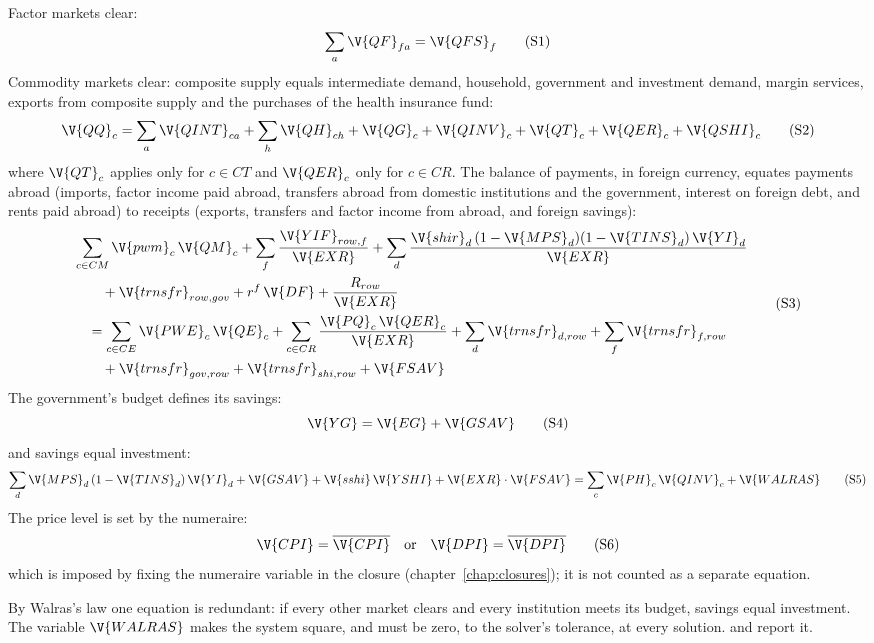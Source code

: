 Factor markets clear:
\begin{equation}
\sum_a \V{QF}_{fa} = \V{QFS}_f
\tag{S1}\label{eq:S1}
\end{equation}
Commodity markets clear: composite supply equals intermediate demand,
household, government and investment demand, margin services, exports from
composite supply and the purchases of the health insurance fund:
\begin{equation}
\V{QQ}_c = \sum_a \V{QINT}_{ca} + \sum_h \V{QH}_{ch} + \V{QG}_c + \V{QINV}_c + \V{QT}_c + \V{QER}_c + \V{QSHI}_c
\tag{S2}\label{eq:S2}
\end{equation}
where $\V{QT}_c$ applies only for $c \in CT$ and $\V{QER}_c$ only for
$c \in CR$. The balance of payments, in foreign currency, equates payments
abroad (imports, factor income paid abroad, transfers abroad from domestic
institutions and the government, interest on foreign debt, and rents paid
abroad) to receipts (exports, transfers and factor income from abroad, and
foreign savings):
\begin{equation}
\begin{split}
&\sum_{c \in CM} \V{pwm}_c\,\V{QM}_c + \sum_f \frac{\V{YIF}_{row,f}}{\V{EXR}}
  + \sum_d \frac{\V{shir}_d\,(1 - \V{MPS}_d)(1 - \V{TINS}_d)\,\V{YI}_d}{\V{EXR}}\\
&\qquad + \V{trnsfr}_{row,gov} + r^f\,\V{DF} + \frac{R_{row}}{\V{EXR}}\\
&\quad = \sum_{c \in CE} \V{PWE}_c\,\V{QE}_c + \sum_{c \in CR} \frac{\V{PQ}_c\,\V{QER}_c}{\V{EXR}}
  + \sum_d \V{trnsfr}_{d,row} + \sum_f \V{trnsfr}_{f,row}\\
&\qquad + \V{trnsfr}_{gov,row} + \V{trnsfr}_{shi,row} + \V{FSAV}
\end{split}
\tag{S3}\label{eq:S3}
\end{equation}
The government's budget defines its savings:
\begin{equation}
\V{YG} = \V{EG} + \V{GSAV}
\tag{S4}\label{eq:S4}
\end{equation}
and savings equal investment:
\begin{equation}
\sum_d \V{MPS}_d\,(1 - \V{TINS}_d)\,\V{YI}_d + \V{GSAV} + \V{sshi}\,\V{YSHI} + \V{EXR}\cdot\V{FSAV}
  = \sum_c \V{PH}_c\,\V{QINV}_c + \V{WALRAS}
\tag{S5}\label{eq:S5}
\end{equation}
The price level is set by the numeraire:
\begin{equation}
\V{CPI} = \overline{\V{CPI}} \quad\text{or}\quad \V{DPI} = \overline{\V{DPI}}
\tag{S6}\label{eq:S6}
\end{equation}
which is imposed by fixing the numeraire variable in the closure
(chapter~\ref{chap:closures}); it is not counted as a separate equation.

By Walras's law one equation is redundant: if every other market clears and
every institution meets its budget, savings equal investment. The variable
$\V{WALRAS}$ makes the system square, and must be zero, to the solver's
tolerance, at every solution.  and 
report it.

